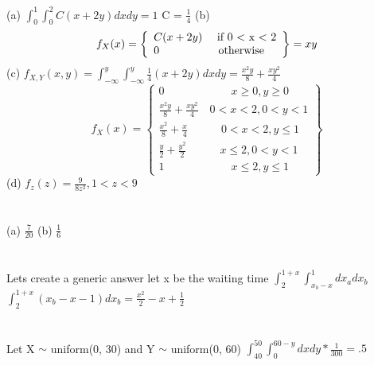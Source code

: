 \documentclass{report}
\begin{document}
\section{}
(a) $\int_{0}^{1}\int_{0}^{2}C(x + 2y)dxdy = 1$
\newline
C = $\frac{1}{4}$
\newline
(b) \[
	f_X(x) = \left\{\begin{array}{lr}
	C(x + 2y) \text{ \quad if 0 < x < 2} \\
	\text{0 \quad \quad \quad \quad \quad otherwise}
\end{array}\right\} = xy
\]
\newline
(c) $f_{X, Y}(x, y) = \int_{-\infty}^{y}\int_{-\infty}^{y}\frac{1}{4}(x+2y)dxdy = \frac{x^2y}{8} + \frac{xy^2}{4}$
\[
f_X(x) = \left\{\begin{array}{lr}
	0 \quad \quad \quad \quad \quad \quad x \ge 0, y \ge 0 \\
	\frac{x^2y}{8} + \frac{xy^2}{4} \quad 0 < x < 2, 0 < y < 1 \\
	\frac{x^2}{8} + \frac{x}{4} \quad \quad \quad 0 < x < 2,  y \le 1 \\
	\frac{y}{2} + \frac{y^2}{2} \quad \quad \quad x \le 2, 0 < y < 1 \\
	1 \quad \quad \quad \quad \quad \quad x \le 2, y \le 1
	
\end{array}\right\}
\]
\newline
(d) $f_z(z) = \frac{9}{8z^2}, 1 < z < 9$
\newline

\section{}
(a) $\frac{7}{20}$
\newline
(b) $\frac{1}{6}$
\newline

\section{}
Lets create a generic answer
let x be the waiting time
$\int_{2}^{1 + x}\int_{x_b - x}^{1}dx_adx_b$
\newline
$\int_{2}^{1 + x}(x_b - x - 1)dx_b = \frac{x^2}{2} - x + \frac{1}{2}$
\newline

\section{}
Let X $\sim$ uniform(0, 30) and Y $\sim$ uniform(0, 60)
\newline
$\int_{40}^{50}\int_{0}^{60 - y}dxdy * \frac{1}{300} = .5$
\newline
\end{document}
